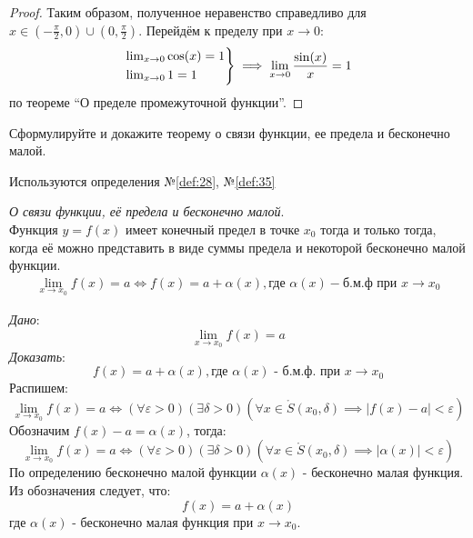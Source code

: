 \begin{proof}
    Таким образом, полученное неравенство справедливо для $x \in \left(-\frac{\pi}{2}, 0\right) \cup \left(0, \frac{\pi}{2}\right)$. Перейдём к пределу при $x \to 0$:
    \begin{gather*}
        \begin{rcases*}
            \lim_{x \to 0} \cos(x) = 1 \\
            \lim_{x \to 0} 1 = 1 
        \end{rcases*} 
        \implies \lim_{x \to 0} \frac{\sin(x)}{x} = 1
    \end{gather*}
    по теореме ``О пределе промежуточной функции''.

\end{proof}



\begin{question}
    Сформулируйте и докажите теорему о связи функции, ее предела и бесконечно малой.
\end{question}
\begin{used}
    Используются определения №\ref{def:28}, №\ref{def:35}
\end{used}
\begin{theorem}
    \textit{О связи функции, её предела и бесконечно малой}. \\
    Функция $y = f(x)$ имеет конечный предел в точке  $x_0$ тогда и только тогда, когда её можно представить в виде суммы предела и некоторой бесконечно малой функции.
    \begin{gather*}
        \lim_{x \to x_0} f(x) = a \iff f(x) = a + \alpha(x), \text{где } \alpha(x) - \text{б.м.ф при } x \to x_0
    \end{gather*}
\end{theorem}
\begin{necessity}
    \textit{Дано}: \[
        \lim_{x \to x_0} f(x) = a
    \]
    \textit{Доказать}: \[
        f(x) = a + \alpha(x), \text{где } \alpha(x) \text{ - б.м.ф. при } x \to  x_0
    \]
    Распишем: \[
        \lim_{x \to x_0} f(x) = a \iff (\forall \varepsilon > 0)(\exists \delta > 0)(\forall x \in \mathring{S}(x_0, \delta) \implies |f(x) - a| < \varepsilon)  
    \]
    Обозначим $f(x) - a = \alpha(x)$, тогда: \[
        \lim_{x \to x_0} f(x) = a \iff (\forall \varepsilon > 0)(\exists \delta > 0)(\forall x \in \mathring{S}(x_0, \delta) \implies |\alpha(x)| < \varepsilon)  
    \]
    По определению бесконечно малой функции $\alpha(x)$ - бесконечно малая функция. Из обозначения следует, что: \[
        f(x) = a + \alpha(x)
    \]
    где $\alpha(x)$ - бесконечно малая функция при $x \to x_0$.
\end{necessity}
